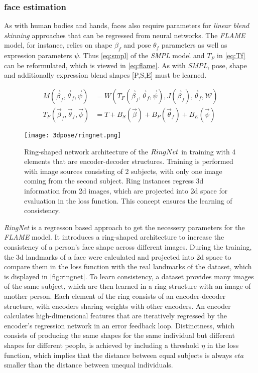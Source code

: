  

\subsubsection{face estimation}
As with human bodies and hands, faces also require parameters for \emph{linear blend skinning} approaches that can be regressed from neural networks. The \emph{FLAME} model, for instance, relies on shape $\beta_{f}$ and pose $\theta_{f}$ parameters as well as expression parameters  $\psi$. Thus \autoref{eq:smpl} of the \emph{SMPL} model and $T_{F}$ in \autoref{eq:Tf} can be reformulated, which is viewed in \autoref{eq:flame}. As with \emph{SMPL}, pose, shape and additionally expression blend shapes [P,S,E] must be learned. \cite{flame}

\begin{equation}
\label{eq:flame}
\begin{split}
M(\vec{\beta}_{f},\vec{\theta}_{f}, \vec{\psi}) &= W(T_{F}(\vec{\beta}_{f},\vec{\theta}_{f}, \vec{\psi}),J(\vec{\beta}_{f}),\vec{\theta}_{f},\mathcal{W}) \\
T_{F}(\vec{\beta}_{f},\vec{\theta}_{f}, \vec{\psi}) &= T + B_{S}(\vec{\beta}) + B_{P}(\vec{\theta}_{f}) + B_{E} (\vec{\psi})
\end{split}
\end{equation}

\begin{figure}[h]
	\centering
	\texttt{[image: 3dpose/ringnet.png]}
	\caption{Ring-shaped network architecture of the $\protect RingNet$ in training with 4 elements that are encoder-decoder structures. Training is performed with image sources consisting of 2 subjects, with only one image coming from the second subject. Ring instances regress 3d information from 2d images, which are projected into 2d space for evaluation in the loss function. This concept ensures the learning of consistency.\cite{ringnet}}
	\label{fig:ringnet}
\end{figure}

\emph{RingNet} is a regresson based approach to get the necessery parameters for the \emph{FLAME} model. It introduces a ring-shaped architecture to increase the consistency of a person's face shape across different images. During the training, the 3d landmarks of a face were calculated and projected into 2d space to compare them in the loss function with the real landmarks of the dataset, which is displayed in \autoref{fig:ringnet}. To learn consistency, a dataset provides many images of the same subject, which are then learned in a ring structure with an image of another person. Each element of the ring consists of an encoder-decoder structure, with encoders sharing weights with other encoders. An encoder calculates high-dimensional features that are iteratively regressed by the encoder's regression network in an error feedback loop. Distinctness, which consists of producing the same shapes for the same individual but different shapes for different people, is achieved by including a threshold $\eta$ in the loss function, which implies that the distance between equal subjects is always $eta$ smaller than the distance between unequal individuals. \cite{ringnet}
